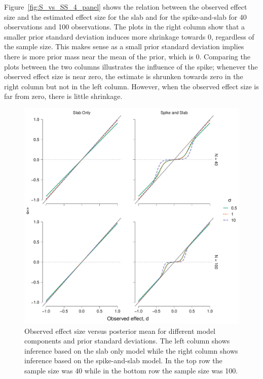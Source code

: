 \documentclass[a4paper]{article}
\newenvironment{revision}{\color{teal}}{\color{black}}
\begin{document}
\begin{revision}
Figure~\ref{fig:S_vs_SS_4_panel} shows the relation between the observed effect size and the estimated effect size for the slab and for the spike-and-slab for 40 observations and 100 observations.
The plots in the right column show that a smaller prior standard deviation induces more shrinkage towards 0, regardless of the sample size.
This makes sense as a small prior standard deviation implies there is more prior mass near the mean of the prior, which is 0.
Comparing the plots between the two columns illustrates the influence of the spike; whenever the observed effect size is near zero, the estimate is shrunken towards zero in the right column but not in the left column.
However, when the observed effect size is far from zero, there is little shrinkage.
\begin{figure}[!ht]
	\includegraphics[width=\textwidth]{posteriorMeanVsSampleDelta_4_panel.pdf}
	\caption{%
		Observed effect size versus posterior mean for different model components and prior standard deviations.
		The left column shows inference based on the slab only model while the right column shows inference based on the spike-and-slab model.
		In the top row the sample size was 40 while in the bottom row the sample size was 100.
}
\end{figure}
\end{revision}
\end{document}
